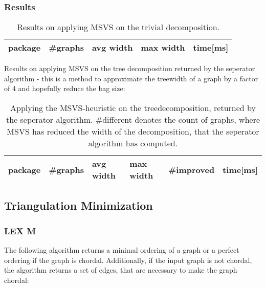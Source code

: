 \documentclass[a4wide]{article}
\begin{document}
\subsubsection{Results}

\begin{table}[h!]
\begin{tabular}{|l|l|l|l|l|}
\hline
package & \#graphs & avg width & max width & time[ms] \\
\hline
\hline

\hline
\end{tabular}
\caption{Results on applying MSVS on the trivial decomposition.}
\end{table}

\newpage

Results on applying MSVS on the tree decomposition returned by the seperator algorithm - this is a method to approximate the treewidth of a graph by a factor of 4 and hopefully reduce the bag size:

\begin{table}[h!]
\begin{tabular}{|l|l|l|l|l|l|}
\hline
package & \#graphs & avg width & max width & \#improved & time[ms] \\
\hline
\hline

\hline
\end{tabular}

\caption{Applying the MSVS-heuristic on the treedecomposition, returned by the seperator algorithm. \#different denotes the count of graphs, where MSVS has reduced the width of the decomposition, that the seperator algorithm has computed.}
\end{table}

\subsection{Triangulation Minimization}

\subsubsection{LEX M}

The following algorithm returns a minimal ordering of a graph or a perfect ordering if the graph is chordal. Additionally, if the input graph is not chordal, the algorithm returns a set of edges, that are necessary to make the graph chordal:
\end{document}
